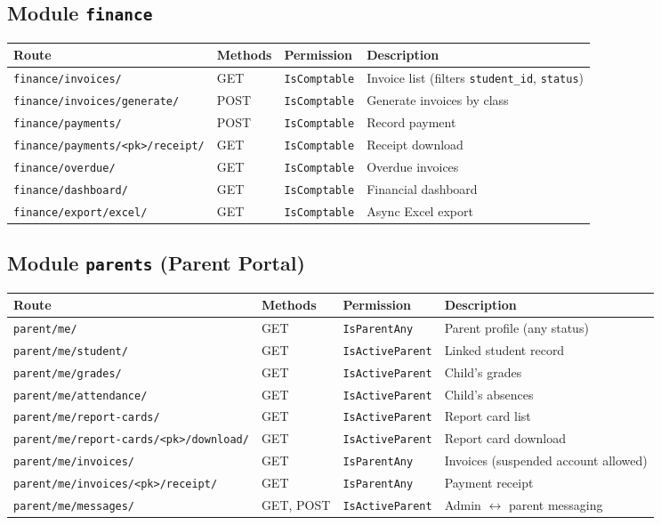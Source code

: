 \documentclass[11pt,a4paper]{article}
\begin{document}
\subsection{Module \texttt{finance}}

\begin{longtable}{@{}lllp{5.5cm}@{}}
\toprule
\textbf{Route} & \textbf{Methods} & \textbf{Permission} & \textbf{Description} \\
\midrule
\endhead
\texttt{finance/invoices/} & GET & \texttt{IsComptable} & Invoice list (filters \texttt{student\_id}, \texttt{status}) \\
\texttt{finance/invoices/generate/} & POST & \texttt{IsComptable} & Generate invoices by class \\
\texttt{finance/payments/} & POST & \texttt{IsComptable} & Record payment \\
\texttt{finance/payments/<pk>/receipt/} & GET & \texttt{IsComptable} & Receipt download \\
\texttt{finance/overdue/} & GET & \texttt{IsComptable} & Overdue invoices \\
\texttt{finance/dashboard/} & GET & \texttt{IsComptable} & Financial dashboard \\
\texttt{finance/export/excel/} & GET & \texttt{IsComptable} & Async Excel export \\
\bottomrule
\end{longtable}

\subsection{Module \texttt{parents} (Parent Portal)}

\begin{longtable}{@{}lllp{5.5cm}@{}}
\toprule
\textbf{Route} & \textbf{Methods} & \textbf{Permission} & \textbf{Description} \\
\midrule
\endhead
\texttt{parent/me/} & GET & \texttt{IsParentAny} & Parent profile (any status) \\
\texttt{parent/me/student/} & GET & \texttt{IsActiveParent} & Linked student record \\
\texttt{parent/me/grades/} & GET & \texttt{IsActiveParent} & Child's grades \\
\texttt{parent/me/attendance/} & GET & \texttt{IsActiveParent} & Child's absences \\
\texttt{parent/me/report-cards/} & GET & \texttt{IsActiveParent} & Report card list \\
\texttt{parent/me/report-cards/<pk>/download/} & GET & \texttt{IsActiveParent} & Report card download \\
\texttt{parent/me/invoices/} & GET & \texttt{IsParentAny} & Invoices (suspended account allowed) \\
\texttt{parent/me/invoices/<pk>/receipt/} & GET & \texttt{IsParentAny} & Payment receipt \\
\texttt{parent/me/messages/} & GET, POST & \texttt{IsActiveParent} & Admin $\leftrightarrow$ parent messaging \\
\bottomrule
\end{longtable}
\end{document}
